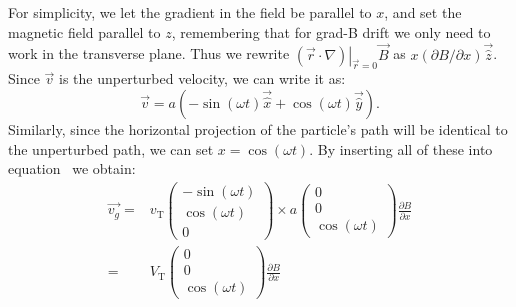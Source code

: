 For simplicity, we let the gradient in the field be parallel to $x$, and set the magnetic field parallel to $z$, remembering that for grad-B drift we only need to work in the transverse plane.
Thus we rewrite 
$\left.(\vec{r}\cdot\nabla)\right|_{\vec{r}=0}\vec{B}$ as $x(\partial B/\partial x) \vec{\hat{z}}$.
Since $\vec{v}$ is the unperturbed velocity, we can write it as:
\begin{equation}
\vec{v}=a\left(-\sin(\omega t)\vec{\hat{x}}+\cos(\omega t)\vec{\hat{y}}\right).
\end{equation}
Similarly, since the horizontal projection of the particle's path will be identical to the unperturbed path, we can set $x=\cos(\omega t)$.
By inserting all of these into equation~ we obtain:
\begin{align}
\vec{v_g}=&v_\textrm{T}
\begin{pmatrix} -\sin(\omega t)\\ \cos(\omega t)\\ 0 \end{pmatrix}
\times a
\begin{pmatrix}0\\0\\\cos(\omega t)\end{pmatrix}\frac{\partial B}{\partial x}\\
=&V_\textrm{T}\begin{pmatrix}0\\0\\\cos(\omega t)\end{pmatrix}\frac{\partial B}{\partial x}\\
\end{align}

